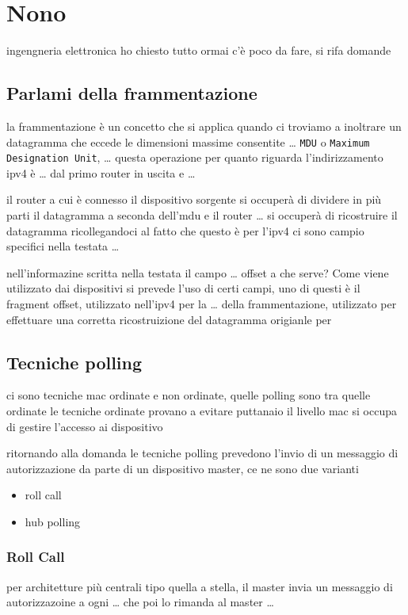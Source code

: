 \documentclass[11pt]{article}
\begin{document}
\section{Nono}
\label{sec:org65f6d47}
ingengneria elettronica
ho chiesto tutto ormai c'è poco da fare, si rifa domande
\subsection{Parlami della frammentazione}
\label{sec:org746165f}
la frammentazione è un concetto che si applica quando ci troviamo a inoltrare un datagramma che eccede le dimensioni massime consentite
\ldots{} \texttt{MDU} o \texttt{Maximum Designation Unit}, \ldots{} questa operazione per quanto riguarda l'indirizzamento ipv4 è \ldots{} dal primo router in uscita e \ldots{}

il router a cui è connesso il dispositivo sorgente si occuperà di dividere in più parti il datagramma a seconda dell'mdu e il router \ldots{} si occuperà di ricostruire il datagramma
ricollegandoci al fatto che questo è per l'ipv4 ci sono campio specifici nella testata \ldots{}

nell'informazine scritta nella testata il campo \ldots{} offset a che serve? Come viene utilizzato dai dispositivi
si prevede l'uso di certi campi, uno di questi è il fragment offset, utilizzato nell'ipv4 per la \ldots{} della frammentazione, utilizzato per effettuare una corretta ricostruizione del datagramma origianle per

\subsection{Tecniche polling}
\label{sec:org7915560}
ci sono tecniche mac ordinate e non ordinate, quelle polling sono tra quelle ordinate
le tecniche ordinate provano a evitare puttanaio
il livello mac si occupa di gestire l'accesso ai dispositivo

ritornando alla domanda le tecniche polling prevedono l'invio di un messaggio di autorizzazione da parte di un dispositivo master, ce ne sono due varianti
\begin{itemize}
\item roll call
\item hub polling
\end{itemize}

\subsubsection{Roll Call}
\label{sec:org3239b05}
per architetture più centrali tipo quella a stella, il master invia un messaggio di autorizzazoine a ogni \ldots{} che poi lo rimanda al master \ldots{}
\end{document}
